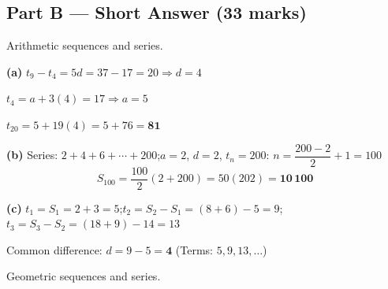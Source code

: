 \documentclass[addpoints]{exam}
\begin{document}
\begin{questions}
\section*{Part B --- Short Answer (33 marks)}

\question Arithmetic sequences and series.
\begin{solution}[10cm]
\textbf{(a)} $t_9 - t_4 = 5d = 37 - 17 = 20 \Rightarrow d = 4$

$t_4 = a + 3(4) = 17 \Rightarrow a = 5$

$t_{20} = 5 + 19(4) = 5 + 76 = \mathbf{81}$

\textbf{(b)} Series: $2 + 4 + 6 + \cdots + 200$;\quad $a=2$, $d=2$, $t_n = 200$:
$n = \dfrac{200-2}{2}+1 = 100$
\[
S_{100} = \frac{100}{2}(2+200) = 50(202) = \mathbf{10\,100}
\]

\textbf{(c)} $t_1 = S_1 = 2+3 = 5$;\quad $t_2 = S_2 - S_1 = (8+6) - 5 = 9$;\quad
$t_3 = S_3 - S_2 = (18+9) - 14 = 13$

Common difference: $d = 9 - 5 = \mathbf{4}$
(Terms: $5, 9, 13, \ldots$)
\end{solution}

\question Geometric sequences and series.
\end{questions}
\end{document}
